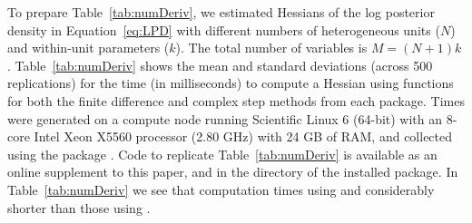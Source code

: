 \documentclass[jss]{jss}\usepackage[]{graphicx}\usepackage[]{color}
\newcommand{\func}[1]{\code{#1}}
\begin{document}
To prepare Table~\ref{tab:numDeriv}, we
estimated Hessians of the log posterior density in Equation~\ref{eq:LPD} with different numbers of heterogeneous
units ($N$) and within-unit parameters ($k$).  The total number of
variables is $M=(N+1)k$.  Table~\ref{tab:numDeriv} shows the mean
and standard deviations (across 500 replications) for the time (in
milliseconds) to compute a Hessian using functions for both the finite
difference and complex step methods from each package. Times were generated on a
compute node running Scientific Linux 6 (64-bit) with an 8-core Intel
Xeon X5560 processor (2.80 GHz) with 24 GB of RAM, and collected using the  package
\citep{R_microbenchmark}. Code to replicate Table~\ref{tab:numDeriv}
is available as an online supplement to this paper, and in the
\func{doc/} directory of the installed package. In
Table~\ref{tab:numDeriv} we see that computation times using
 and considerably shorter than those using .
\end{document}
